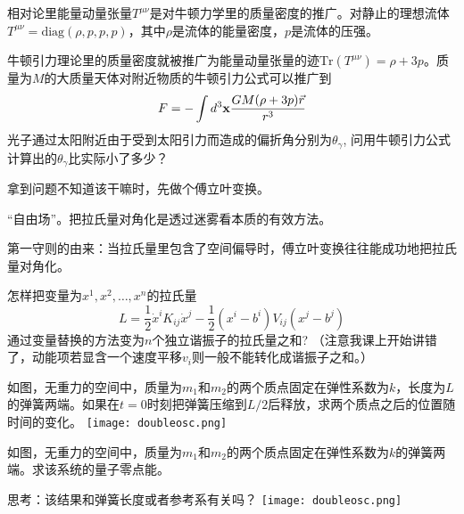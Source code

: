 \documentclass[CJK]{beamer}
\begin{document}
\begin{frame}
\bch
相对论里能量动量张量$T^{\mu\nu}$是对牛顿力学里的质量密度的推广。对静止的理想流体$T^{\mu\nu} = \mathrm{diag}(\rho, p, p, p)$，其中$\rho$是流体的能量密度，$p$是流体的压强。

牛顿引力理论里的质量密度就被推广为能量动量张量的迹$\mathrm{Tr}(T^{\mu\nu}) = \rho + 3p$。质量为$M$的大质量天体对附近物质的牛顿引力公式可以推广到
$$ F = - \int d^3{\mathbf{x}} \frac{GM(\rho + 3p) \vec{r}}{r^3}$$
光子通过太阳附近由于受到太阳引力而造成的偏折角分别为$\theta_\gamma$, 问用牛顿引力公式计算出的$\theta_\gamma$比实际小了多少？

\ech
\end{frame}

\begin{frame}
\bch
拿到问题不知道该干嘛时，先做个傅立叶变换。
\ech
\end{frame}

\begin{frame}
\bch

{“自由场”。把拉氏量对角化是透过迷雾看本质的有效方法。

\skipline
 第一守则的由来：当拉氏量里包含了空间偏导时，傅立叶变换往往能成功地把拉氏量对角化。}

\ech
\end{frame}

\begin{frame}
\bch
怎样把变量为$x^1, x^2,\ldots, x^n$的拉氏量
$$L = \frac{1}{2} \dot{x}^i K_{ij}\dot{x}^j - \frac{1}{2} (x^i-b^i) V_{ij} (x^j - b^j)$$
通过变量替换的方法变为$n$个独立谐振子的拉氏量之和? （注意我课上开始讲错了，动能项若显含一个速度平移$v_i$则一般不能转化成谐振子之和。）
\ech
\end{frame}


\begin{frame}
\bch
{}
如图，无重力的空间中，质量为$m_1$和$m_2$的两个质点固定在弹性系数为$k$，长度为$L$的弹簧两端。如果在$t=0$时刻把弹簧压缩到$L/2$后释放，求两个质点之后的位置随时间的变化。
\emini
{}
\texttt{[image: doubleosc.png]}
\emini
\ech
\end{frame}


\begin{frame}
\bch
{}
如图，无重力的空间中，质量为$m_1$和$m_2$的两个质点固定在弹性系数为$k$的弹簧两端。求该系统的量子零点能。

\skipline
思考：该结果和弹簧长度或者参考系有关吗？
\emini
{}
\texttt{[image: doubleosc.png]}
\emini
\ech
\end{frame}
\end{document}
